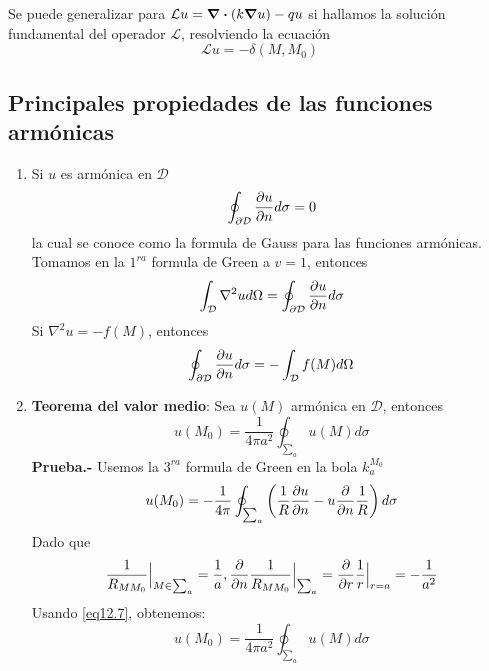 \documentclass[../main]{subfiles}
\begin{document}
Se puede generalizar para $\mathcal{L}u=\div{(k\grad{u})}-qu$ si hallamos la solución fundamental del operador $\mathcal{L}$, resolviendo la ecuación
\begin{equation}
    \mathcal{L}u=-\delta(M,M_0)
\end{equation}
\subsection{Principales propiedades de las funciones armónicas}
\begin{enumerate}
    \item Si $u$ es armónica en $\mathcal{D}$
    \begin{equation}
        \oint_{\partial \mathcal{D}} \pdv{u}{n}d\sigma=0
    \end{equation}
    la cual se conoce como la formula de Gauss para las funciones armónicas. \\[0.3cm]
    Tomamos en la $1^{ra}$ formula de Green a $v=1$, entonces
    \begin{equation}
        \int_{\mathcal{D}} \nabla^2 ud\Omega=\oint_{\partial\mathcal{D}} \pdv{u}{n} d\sigma
    \end{equation}
    Si $\nabla^2 u=-f(M)$, entonces
    \begin{equation}
        \oint_{\partial\mathcal{D}} \pdv{u}{n}d\sigma = -\int_{\mathcal{D}} f(M)d\Omega
    \end{equation}
    \item \textbf{Teorema del valor medio}: Sea $u(M)$ armónica en $\mathcal{D}$, entonces
    \begin{equation}
        u(M_0)=\dfrac{1}{4\pi a^2}\oint_{\sum_{a}} u(M)d\sigma
    \end{equation}
    \textbf{Prueba.-} Usemos la $3^{ra}$ formula de Green en la bola $k_a^{M_0}$
    \begin{equation}
        u(M_0)=-\dfrac{1}{4\pi}\oint_{\sum_a}\left(\dfrac{1}{R}\pdv{u}{n}-u\pdv{}{n}\dfrac{1}{R}\right)d\sigma
    \end{equation}
    Dado que
    \begin{equation}
        \dfrac{1}{R_{M M_0}} \Big{|}_{M \in \sum_a}=\dfrac{1}{a}, \pdv{}{n}\dfrac{1}{R_{M M_0}}\Big{|}_{\sum_a}=\pdv{}{r}\dfrac{1}{r}\Big{|}_{r=a}=-\dfrac{1}{a^2}
    \end{equation}
    Usando \eqref{eq12.7}, obtenemos:
    \begin{equation}
        u(M_0)=\dfrac{1}{4\pi a^2}\oint_{\sum_a} u(M)d\sigma
    \end{equation}

\end{enumerate}
\end{document}
